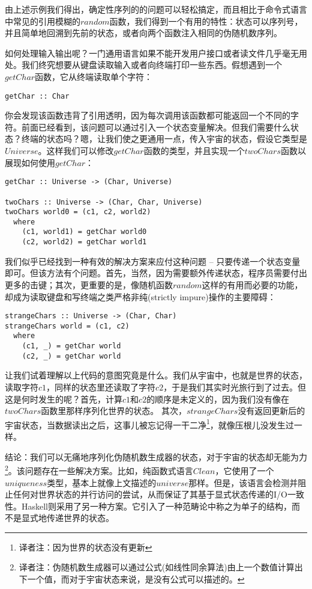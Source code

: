 由上述示例我们得出，确定性序列的的问题可以轻松搞定，而且相比于命令式语言中常见的引用模糊的$random$函数，我们得到一个有用的特性：状态可以序列号，并且简单地回溯到先前的状态，或者向两个函数注入相同的伪随机数序列。

如何处理输入输出呢？一门通用语言如果不能开发用户接口或者读文件几乎毫无用处。我们终究想要从键盘读取输入或者向终端打印一些东西。假想遇到一个$getChar$函数，它从终端读取单个字符：

\begin{lstlisting}
getChar :: Char
\end{lstlisting}

你会发现该函数违背了引用透明，因为每次调用该函数都可能返回一个不同的字符。前面已经看到，该问题可以通过引入一个状态变量解决。但我们需要什么状态？终端的状态吗？嗯，让我们使之更通用一点，传入宇宙的状态，假设它类型是$Universe$。这样我们可以修改$getChar$函数的类型，并且实现一个$twoChars$函数以展现如何使用$getChar$：

\begin{lstlisting}
getChar :: Universe -> (Char, Universe)

twoChars :: Universe -> (Char, Char, Universe)
twoChars world0 = (c1, c2, world2)
  where
    (c1, world1) = getChar world0
    (c2, world2) = getChar world1
\end{lstlisting}

我们似乎已经找到一种有效的解决方案来应付这种问题 -- 只要传递一个状态变量即可。但该方法有个问题。首先，当然，因为需要额外传递状态，程序员需要付出更多的击键；其次，更重要的是，像随机函数$random$这样的有用而必要的功能，却成为读取键盘和写终端之类严格非纯(strictly impure)操作的主要障碍：

\begin{lstlisting}
strangeChars :: Universe -> (Char, Char)
strangeChars world = (c1, c2)
  where
    (c1, _) = getChar world
    (c2, _) = getChar world
\end{lstlisting}

让我们试着理解以上代码的意图究竟是什么。我们从宇宙中，也就是世界的状态， 读取字符$c1$，同样的状态里还读取了字符$c2$，于是我们其实时光旅行到了过去。但这是何时发生的呢？首先，计算$c1$和$c2$的顺序是未定义的，因为我们没有像在$twoChars$函数里那样序列化世界的状态。 其次，$strangeChars$没有返回更新后的宇宙状态，当数据读出之后，这事儿被忘记得一干二净\footnote{译者注：因为世界的状态没有更新}，就像压根儿没发生过一样。

结论：我们可以无痛地序列化伪随机数生成器的状态，对于宇宙的状态却无能为力\footnote{译者注：伪随机数生成器可以通过公式(如线性同余算法)由上一个数值计算出下一个值，而对于宇宙状态来说，是没有公式可以描述的。}。该问题存在一些解决方案。比如，纯函数式语言$Clean$，它使用了一个$uniqueness$类型，基本上就像上文描述的$universe$那样。但是，该语言会检测并阻止任何对世界状态的并行访问的尝试，从而保证了其基于显式状态传递的I/O一致性。Haskell则采用了另一种方案。它引入了一种范畴论中称之为单子的结构，而不是显式地传递世界的状态。